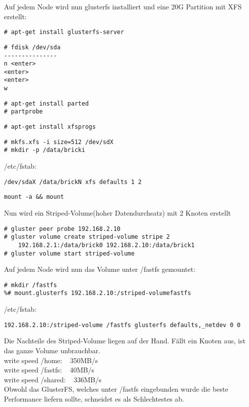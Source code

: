 Auf jedem Node wird nun glusterfs installiert und eine 20G Partition mit
XFS erstellt:
\begin{lstlisting}[style=Bash]
# apt-get install glusterfs-server
\end{lstlisting}
\begin{lstlisting}[style=Bash]
# fdisk /dev/sda
---------------
n <enter>
<enter>
<enter>
w
\end{lstlisting}
\begin{lstlisting}[style=Bash]
# apt-get install parted
# partprobe
\end{lstlisting}
\begin{lstlisting}[style=Bash]
# apt-get install xfsprogs
\end{lstlisting}
\begin{lstlisting}[style=Bash]
# mkfs.xfs -i size=512 /dev/sdX
# mkdir -p /data/bricki
\end{lstlisting}
/etc/fstab:
\begin{lstlisting}[style=Bash]
/dev/sdaX /data/brickN xfs defaults 1 2
\end{lstlisting}
\begin{lstlisting}[style=Bash]
mount -a && mount
\end{lstlisting}
Nun wird ein Striped-Volume(hoher Datendurchsatz) mit 2 Knoten erstellt
\begin{lstlisting}[style=Bash]
# gluster peer probe 192.168.2.10
# gluster volume create striped-volume stripe 2 
    192.168.2.1:/data/brick0 192.168.2.10:/data/brick1
# gluster volume start striped-volume
\end{lstlisting}
Auf jedem Node wird nun das Volume unter /fastfs gemountet:
\begin{lstlisting}[style=Bash]
# mkdir /fastfs 
%# mount.glusterfs 192.168.2.10:/striped-volumefastfs
\end{lstlisting}
/etc/fstab:
\begin{lstlisting}[style=Bash]
192.168.2.10:/striped-volume /fastfs glusterfs defaults,_netdev 0 0
\end{lstlisting}
Die Nachteile des Striped-Volume liegen auf der Hand. Fällt ein Knoten aus,
ist das ganze Volume unbrauchbar.\\
write speed /home: ~ 350MB/s\\
write speed /fastfs: ~ 40MB/s\\
write speed /shared: ~ 336MB/s\\
Obwohl das GlusterFS, welches unter /fastfs eingebunden wurde
die beste Performance liefern sollte, schneidet es als Schlechtestes ab.
